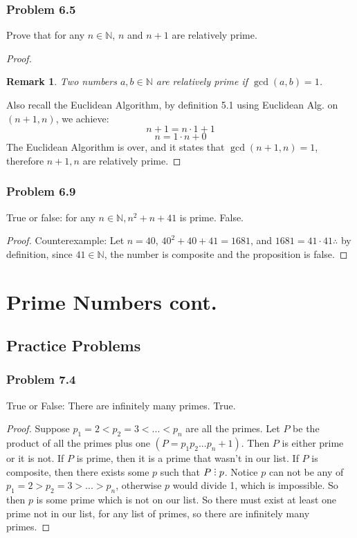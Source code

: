 \documentclass[hidelinks,12pt]{article}
\newtheorem*{remark}{Remark}
\newcommand{\N}{\mathbb{N}}
\newcommand{\divby}{%
  \mathrel{\text{\vbox{\baselineskip.65ex\lineskiplimit0pt\hbox{.}\hbox{.}\hbox{.}}}}%
  }
\begin{document}
\subsubsection{Problem 6.5}
Prove that for any $n\in\N$, $n$ and $n+1$ are relatively prime.
\begin{proof}
\begin{remark}Two numbers $a,b\in\N$ are relatively prime if $\gcd(a,b)=1$.\end{remark}
Also recall the Euclidean Algorithm, by definition 5.1 using Euclidean Alg. on $(n+1,n)$, we achieve:$$n+1=n\cdot1+1$$ $$n=1\cdot n+0$$
The Euclidean Algorithm is over, and it states that $\gcd(n+1,n)=1$, therefore $n+1,n$ are relatively prime.
\end{proof}
\subsubsection{Problem 6.9}
True or false: for any $n\in\N, n^2+n+41$ is prime.
False.
\begin{proof}
Counterexample: Let $n=40$, $40^2+40+41=1681$, and $1681=41\cdot41 \therefore$ by definition, since $41\in\N$, the number is composite and the proposition is false.
\end{proof}
\newpage
\section{Prime Numbers cont.}
\subsection{Practice Problems}
\subsubsection{Problem 7.4}
True or False: There are infinitely many primes.
\newline True.\begin{proof}
Suppose $p_1=2<p_2=3<...<p_n$ are all the primes. Let $P$ be the product of all the primes plus one $(P=p_1p_2...p_n+1)$. Then $P$ is either prime or it is not. If $P$ is prime, then it is a prime that wasn't in our list. If $P$ is composite, then there exists some $p$ such that $P\divby p$. Notice $p$ can not be any of $p_1=2>p_2=3>...>p_n$, otherwise $p$ would divide 1, which is impossible. So then $p$ is some prime which is not on our list. So there must exist at least one prime not in our list, for any list of primes, so there are infinitely many primes.
\end{proof}
\end{document}
